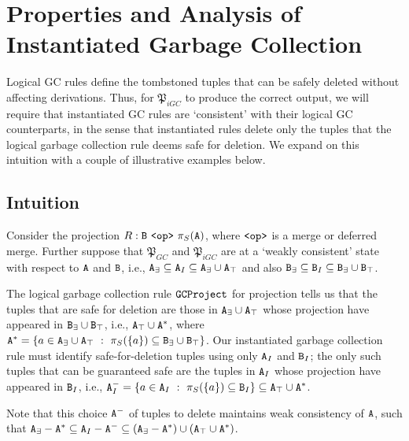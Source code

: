 
\section{Properties and Analysis of Instantiated Garbage Collection}
\label{sec:instantiated}



\setcounter{subsection}{-1}
Logical GC rules define the tombstoned tuples that can be safely deleted without affecting derivations.
Thus, for $\mathfrak{P}_{iGC}$ to produce the correct output, we will require that instantiated GC rules are `consistent' with their logical GC counterparts, in the sense that instantiated rules delete only the tuples that the logical garbage collection rule deems safe for deletion.
We expand on this intuition with a couple of illustrative examples below.

\subsection{Intuition}
\begin{example}
Consider the projection $R: \tt{B} ~\tt{<op>}~ \pi_S(\tt{A})$, where $\tt{<op>}$ is a merge or deferred merge.
Further suppose that $\mathfrak{P}_{GC}$ and $\mathfrak{P}_{iGC}$ are at a `weakly consistent' state with respect to $\tt{A}$ and $\tt{B}$, i.e.,
$\tt{A}_\exists \subseteq \tt{A}_I \subseteq \tt{A}_\exists \cup \tt{A}_\top$ and also
$\tt{B}_\exists \subseteq \tt{B}_I \subseteq \tt{B}_\exists \cup \tt{B}_\top$.

The logical garbage collection rule $\tt{GCProject}$ for projection tells us that the  tuples that are safe for deletion are those in $\tt{A}_\exists \cup \tt{A}_\top$ whose projection have appeared in $\tt{B}_\exists \cup \tt{B}_\top$, i.e., $\tt{A}_\top \cup \tt{A}^*$, where $\tt{A}^* = \{a \in \tt{A}_\exists \cup \tt{A}_\top ~:~ \pi_S(\{a\}) \subseteq \tt{B}_\exists \cup \tt{B}_\top\}$.
Our instantiated garbage collection rule must identify safe-for-deletion tuples using only $\tt{A}_I$ and $\tt{B}_I$; the only such tuples that can be guaranteed safe are the tuples in $\tt{A}_I$ whose projection have appeared in $\tt{B}_I$, i.e., $\tt{A}_I^- = \{a \in \tt{A}_I ~:~ \pi_S(\{a\}) \subseteq \tt{B}_I\} \subseteq \tt{A}_\top \cup \tt{A}^*$.

Note that this choice $\tt{A}^-$ of tuples to delete maintains weak consistency of $\tt{A}$, such that $\tt{A}_\exists - \tt{A}^* \subseteq \tt{A}_I - \tt{A}^- \subseteq (\tt{A}_\exists - \tt{A}^*) \cup (\tt{A}_\top \cup \tt{A}^*)$.
\end{example}

